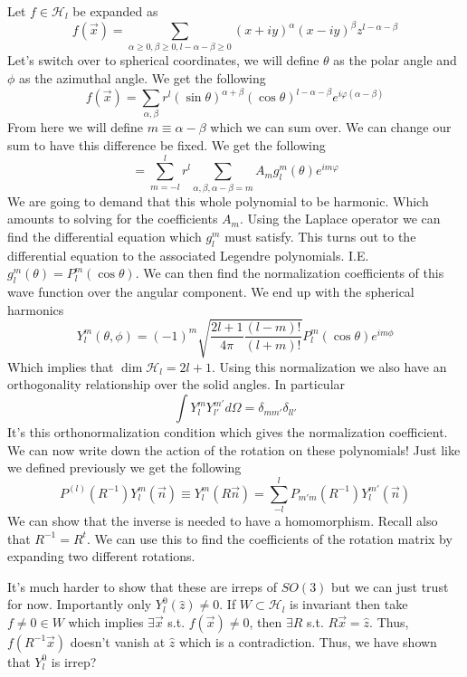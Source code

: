 Let $f \in \mathcal{H}_l$ be expanded as
$$
f(\vec{x}) = \sum_{\alpha \ge 0, \beta \ge 0, l - \alpha - \beta \ge 0}
(x + iy)^\alpha (x - iy)^\beta z^{l - \alpha - \beta}
$$ 
Let's switch over to
spherical coordinates, we will define $\theta$ as the polar angle and $\phi$ as the azimuthal
angle. We get the following
$$
    f(\vec{x}) = \sum_{\alpha, \beta}
    r^l \left(\sin \theta\right)^{\alpha+\beta}
    \left(\cos \theta\right)^{l - \alpha - \beta}
    e^{i \varphi(\alpha - \beta)}
$$
From here we will define $m \equiv \alpha - \beta$ which we can sum over.
We can change our sum to have this difference be fixed. We get the following
$$
= \sum_{m = -l}^{l} r^l \sum_{\alpha, \beta, \alpha - \beta = m}
    A_m g^m_l \left(\theta\right) e^{im \varphi}
$$
We are going to demand that this whole polynomial to be harmonic. Which amounts to
solving for the coefficients $A_m$. Using the Laplace operator we can find the
differential equation which $g_l^m$ must satisfy. This turns out to the differential
equation to the associated Legendre polynomials. I.E.
$g_l^m(\theta) = P_l^m(\cos \theta)$. We can then find the normalization coefficients
of this wave function over the angular component. We end up with the spherical harmonics
$$
    Y_l^m(\theta, \phi) = (-1)^m 
    \sqrt{\frac{2l + 1}{4 \pi} \frac{(l-m)!}{(l+m)!}}
    P_l^m(\cos \theta) e^{im \phi}
$$
Which implies that $\dim \mathcal{H}_l = 2l + 1$. Using this normalization
we also have an orthogonality relationship over the solid angles. In particular
$$
\int Y_l^m Y_{l'}^{m'} d \Omega = \delta_{mm'} \delta_{ll'}
$$
It's this orthonormalization condition which gives the normalization coefficient.
We can now write down the action of the rotation on these polynomials! Just like we
defined previously we get the following
$$
    P^{(l)}(R^{-1}) Y_l^m(\vec{n}) \equiv
    Y_{l}^m(R \vec{n}) = 
    \sum_{-l}^{l} P_{m'm} (R^{-1}) Y_l^{m'}(\vec{n})
$$
We can show that the inverse is needed to have a homomorphism. Recall also
that $R^{-1} = R^t$. We can use this to find the coefficients of the rotation
matrix by expanding two different rotations.

It's much harder to show that these are irreps of $SO(3)$ but we can just trust for now.
Importantly only $Y_l^0(\hat{z}) \ne 0$. If $W \subset \mathcal{H}_l$ is invariant
then take $f\ne 0 \in W$ which implies
$\exists \vec{x}$ s.t. $f(\vec{x}) \ne 0$, then $\exists R$ s.t. $R\vec{x} = \hat{z}$.
Thus, $f(R^{-1} \vec{x})$ doesn't vanish at $\hat{z}$ which is a contradiction. Thus,
we have shown that $Y_l^0$ is irrep?

